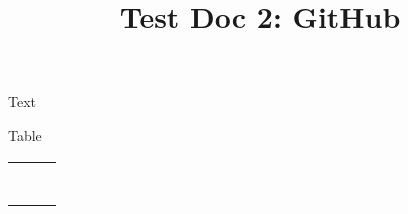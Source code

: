 \documentclass{article}
\begin{document}
\title{Test Doc 2: GitHub }

\maketitle


Text


Table


\begin{tabu} to \textwidth { |X|X|X| }
\hline



 &  & 
 \\


 &  & 
 \\


 &  & 
 \\


 &  & 
 \\


 &  & 
 \\


 &  & 
 \\


 &  & 
 \\
\hline

\end{tabu}
\end{document}
